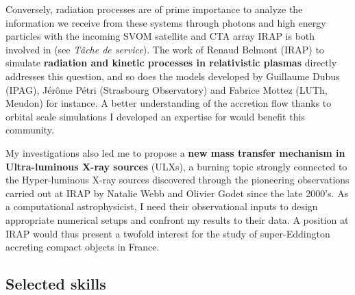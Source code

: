 \documentclass[12pt,onecolumn]{article}
\newcommand{\ulxs}{ULXs\xspace}
\begin{document}
Conversely, radiation processes are of prime importance to analyze the information we receive from these systems through photons and high energy particles with the incoming SVOM satellite and CTA array IRAP is both involved in (see \textit{T\^{a}che de service}). The work of Renaud Belmont (IRAP) to simulate \textbf{radiation and kinetic processes in relativistic plasmas} directly addresses this question, and so does the models developed by Guillaume Dubus (IPAG), J\'{e}r\^{o}me P\'{e}tri (Strasbourg Observatory) and Fabrice Mottez (LUTh, Meudon) for instance. A better understanding of the accretion flow thanks to orbital scale simulations I developed an expertise for would benefit this community.

My investigations also led me to propose a \textbf{new mass transfer mechanism in Ultra-luminous X-ray sources} (\ulxs), a burning topic strongly connected to the Hyper-luminous X-ray sources discovered through the pioneering observations carried out at IRAP by Natalie Webb and Olivier Godet since the late 2000's. As a computational astrophysicist, I need their observational inputs to design appropriate numerical setups and confront my results to their data. A position at IRAP would thus present a twofold interest for the study of super-Eddington accreting compact objects in France.

\subsection*{Selected skills}
\end{document}

